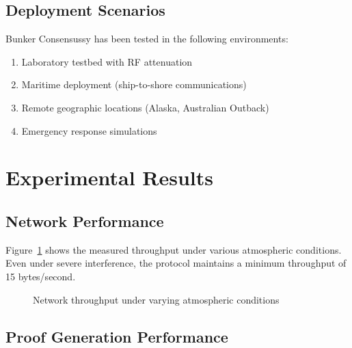 \documentclass[11pt,a4paper]{article}
\begin{document}
\subsection{Deployment Scenarios}

Bunker Consensussy has been tested in the following environments:
\begin{enumerate}
\item Laboratory testbed with RF attenuation
\item Maritime deployment (ship-to-shore communications)
\item Remote geographic locations (Alaska, Australian Outback)
\item Emergency response simulations
\end{enumerate}

\section{Experimental Results}

\subsection{Network Performance}

Figure~\ref{fig:throughput} shows the measured throughput under various atmospheric conditions. Even under severe interference, the protocol maintains a minimum throughput of 15 bytes/second.

\begin{figure}[h]
\centering
{}
\caption{Network throughput under varying atmospheric conditions}
\label{fig:throughput}
\end{figure}

\subsection{Proof Generation Performance}
\end{document}
